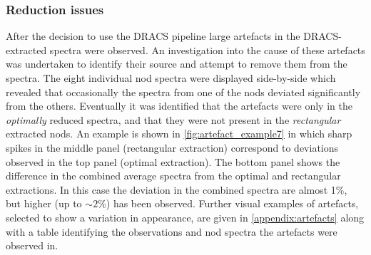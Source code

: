 
\subsubsection{Reduction issues}
\label{subsubsec:reductionartefacts}
After the decision to use the {DRACS} pipeline large artefacts in the {DRACS}-extracted spectra were observed.
An investigation into the cause of these artefacts was undertaken to identify their source and attempt to remove them from the spectra.
The eight individual nod spectra were displayed side-by-side which revealed that occasionally the spectra from one of the nods deviated significantly from the others.
Eventually it was identified that the artefacts were only in the \emph{optimally} reduced spectra, and that they were not present in the \emph{rectangular} extracted nods.
An example is shown in \cref{fig:artefact_example7} in which sharp spikes in the middle panel (rectangular extraction) correspond to deviations observed in the top panel (optimal extraction).
The bottom panel shows the difference in the combined average spectra from the optimal and rectangular extractions.
In this case the deviation in the combined spectra are almost 1\%, but higher (up to $\sim2$\%) has been observed.
Further visual examples of artefacts, selected to show a variation in appearance, are given in \cref{appendix:artefacts} along with a table identifying the observations and nod spectra the artefacts were observed in.

